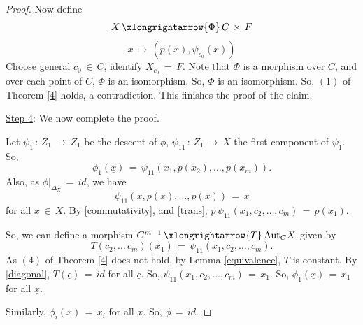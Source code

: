 \documentclass[12pt,reqno]{amsart}
\theoremstyle{definition}
\numberwithin{equation}{section}
\begin{document}
\begin{proof}
Now define
\begin{equation*}
X\,\xlongrightarrow{\Phi}\, C\,\times\, F
\end{equation*}
\begin{equation*}
x\,\longmapsto\, (p(x), \psi_{c_{0}}(x))    
\end{equation*}
Choose general $c_{0}\,\in\, C$, identify $X_{c_{0}}\,=\,F$. Note that $\Phi$ is a morphism over $C$, and over each point of $C$, $\Phi$ is an isomorphism. So, $\Phi$ is an isomorphism. So, $(1)$ of Theorem \ref{4} holds, a contradiction. This finishes the proof of the claim.


\underline{Step 4}: We now complete the proof.

Let $\psi_{1}\,:\, Z_{1}\,\longrightarrow\, Z_{1}$ be the descent of $\phi$, $\psi_{11}\,:\, Z_{1}\,\longrightarrow\,X$ the first component of $\psi_{1}$. So,
\begin{equation}\label{trans}
\phi_{1}(\underline{x})\,=\, \psi_{11}(x_{1}, p(x_{2}),\ldots, p(x_{m})).
\end{equation}
Also, as $\phi{|_{\Delta_{X}}}\,=\, {id}$, we have
\begin{equation}\label{diagonal}
\psi_{11}(x, p(x),\ldots,p(x))\,=\, x    
\end{equation}
for all $x\,\in\, X$. By \eqref{commutativity}, and \eqref{trans}, $p\,\psi_{11}(x_{1}, c_{2},\ldots, c_{m})\,=\, p(x_{1})$. 

So, we can define a morphism $C^{m-1}\,\xlongrightarrow{T}\, \textrm{Aut}_{C}X$ given by
\begin{equation*}
T(c_{2},\ldots\, c_{m})(x_{1})\,=\, \psi_{11}(x_{1},c_{2},\ldots, c_{m}).    
\end{equation*}
As $(4)$ of Theorem \ref{4} does not hold, by Lemma \ref{equivalence}, $T$ is constant. By \eqref{diagonal}, $T(\underline{c})\,=\, {id}$ for all $\underline{c}$. So, $\psi_{11}(x_{1},c_{2},\ldots,c_{m})\,=\,x_{1}$. So, $\phi_{1}(\underline{x})\,=\, x_{1}$ for all $\underline{x}$.

Similarly, $\phi_{i}(\underline{x})\,=\, x_{i}$ for all $\underline{x}$. So, $\phi\,=\, id$.
\end{proof}
\end{document}
